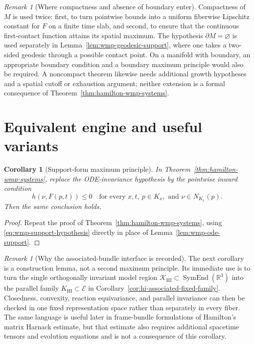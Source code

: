 \documentclass[10pt]{coll-l}
\newtheorem{corollary}[theorem]{Corollary}
\theoremstyle{definition}
\theoremstyle{remark}
\newtheorem{remark}[theorem]{Remark}
\numberwithin{section}{chapter}
\numberwithin{equation}{chapter}
\begin{document}
\begin{remark}[Where compactness and absence of boundary enter]
\label{rem:wmp-compactness}
Compactness of $M$ is used twice: first, to turn pointwise bounds into a
uniform fiberwise Lipschitz constant for $F$ on a finite time slab, and
second, to ensure that the continuous first-contact function attains its
spatial maximum.  The hypothesis $\partial M=\varnothing$ is used
separately in Lemma~\ref{lem:wmp-geodesic-support}, where one takes a
two-sided geodesic through a possible contact point.  On a manifold with
boundary, an appropriate boundary condition and a boundary maximum
principle would also be required.  A noncompact theorem likewise needs
additional growth hypotheses and a spatial cutoff or exhaustion argument;
neither extension is a formal consequence of
Theorem~\ref{thm:hamilton-wmp-systems}.
\end{remark}

\section{Equivalent engine and useful variants}
\label{sec:wmp-variants}

\begin{corollary}[Support-form maximum principle]
\label{cor:wmp-support-form}
In Theorem~\ref{thm:hamilton-wmp-systems}, replace the ODE-invariance
hypothesis by the pointwise inward condition
\begin{equation}
  h(\nu,F(p,t))\leq0
  \quad\text{for every }x,t,\ p\in K_x,\text{ and }
  \nu\in N_{K_x}(p).                                      \label{eq:wmp-support-hypothesis}
\end{equation}
Then the same conclusion holds.
\end{corollary}

\begin{proof}
Repeat the proof of Theorem~\ref{thm:hamilton-wmp-systems}, using
\eqref{eq:wmp-support-hypothesis} directly in place of
Lemma~\ref{lem:wmp-ode-support}.
\end{proof}

\begin{remark}[Why the associated-bundle interface is recorded]
\label{rem:wmp-associated-purpose}
The next corollary is a construction lemma, not a second maximum principle.
Its immediate use is to turn the single orthogonally invariant model region
$\mathcal K_{\mathrm{HI}}\subset\operatorname{SymEnd}(\mathbb R^3)$ into
the parallel family $K_{\mathrm{HI}}\subset\mathcal E$ in
Corollary~\ref{cor:hi-associated-fixed-family}.  Closedness, convexity,
reaction equivariance, and parallel invariance can then be checked in one
fixed representation space rather than separately in every fiber.  The same
language is useful later in frame-bundle formulations of Hamilton's matrix
Harnack estimate, but that estimate also requires additional spacetime
tensors and evolution equations and is not a consequence of this corollary.
\end{remark}
\end{document}
